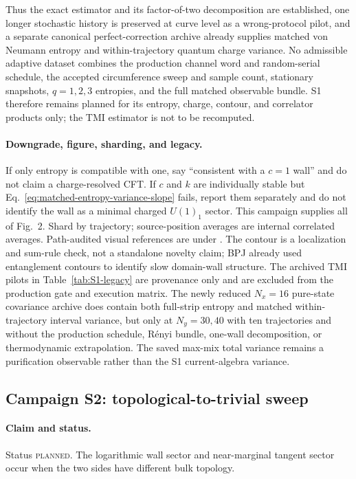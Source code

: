 \documentclass[aps,prx,twocolumn,floatfix,nofootinbib,superscriptaddress,longbibliography]{revtex4-2}
\newcommand{\planned}{\textsc{planned}}
\begin{document}
Thus the exact estimator and its factor-of-two decomposition are established, one longer
stochastic history is preserved at curve level as a wrong-protocol pilot, and a separate canonical
perfect-correction archive already supplies matched von Neumann entropy and
within-trajectory quantum charge variance.  No admissible adaptive dataset combines the
production channel word and random-serial schedule, the accepted circumference sweep and
sample count, stationary snapshots, $q=1,2,3$ entropies, and the full matched observable
bundle.  S1 therefore remains planned for its entropy, charge, contour, and correlator
products only; the TMI estimator is not to be recomputed.

\paragraph*{Downgrade, figure, sharding, and legacy.}
If only entropy is compatible with one, say ``consistent with a $c=1$ wall'' and do not
claim a charge-resolved CFT.  If $c$ and $k$ are individually stable but
Eq.~\eqref{eq:matched-entropy-variance-slope} fails, report them separately and do not
identify the wall as a minimal charged $U(1)_1$ sector.  This campaign supplies all of
Fig.~2.  Shard by trajectory;
source-position averages are internal correlated averages.  Path-audited visual references
are under .  The contour is a
localization and sum-rule
check, not a standalone novelty claim; BPJ already used entanglement contours to identify
slow domain-wall structure.  The archived TMI pilots in
Table~\ref{tab:S1-legacy} are provenance only and are excluded from the production gate and
execution matrix.  The newly reduced
$N_x=16$ pure-state covariance archive does contain both full-strip entropy and matched
within-trajectory interval variance, but only at $N_y=30,40$ with ten trajectories and
without the production schedule, R\'enyi bundle, one-wall decomposition, or thermodynamic
extrapolation.  The saved max-mix total variance remains a purification observable rather
than the S1 current-algebra variance.

\subsection{Campaign S2: topological-to-trivial sweep}
\label{camp:S2}
\paragraph*{Claim and status.}
Status \planned.  The logarithmic wall sector and near-marginal tangent sector occur when
the two sides have different bulk topology.
\end{document}
